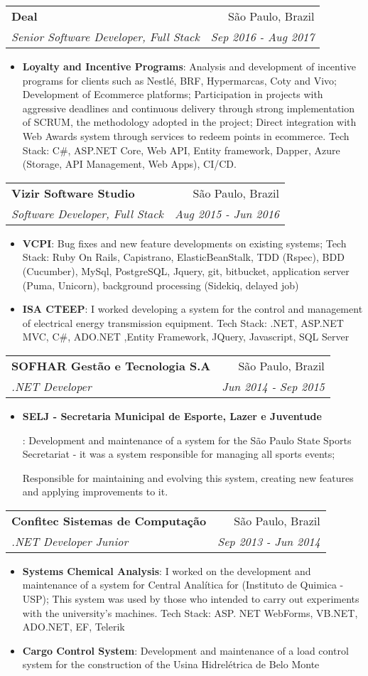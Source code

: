 \documentclass[letterpaper,11pt]{article}
\makeatletter
\newcommand{\resumeItem}[2]{
  \item\small{
    \textbf{#1}{: #2 \vspace{-2pt}}
  }
}
\newcommand{\resumeSubheading}[4]{
  \vspace{-1pt}\item
    \begin{tabular*}{0.97\textwidth}[t]{l@{\extracolsep{\fill}}r}
      \textbf{#1} & #2 \\
      \textit{\small#3} & \textit{\small #4} \\
    \end{tabular*}\vspace{-5pt}
}
\newcommand{\resumeSubSubheading}[2]{
    \begin{tabular*}{0.97\textwidth}{l@{\extracolsep{\fill}}r}
      \textit{\small#1} & \textit{\small #2} \\
    \end{tabular*}\vspace{-5pt}
}
\newcommand{\resumeSubHeadingListEnd}{\end{itemize}}
\newcommand{\resumeItemListStart}{\begin{itemize}}
\newcommand{\resumeItemListEnd}{\end{itemize}\vspace{-5pt}}
\makeatother
\begin{document}
    \resumeSubheading
    {Deal}{São Paulo, Brazil}
    {Senior Software Developer, Full Stack}{Sep 2016 - Aug 2017}
    \resumeItemListStart
      \resumeItem{Loyalty and Incentive Programs}
        {Analysis and development of incentive programs for clients such as Nestlé, BRF, Hypermarcas, Coty and Vivo;
        Development of Ecommerce platforms;
        Participation in projects with aggressive deadlines and continuous delivery through strong implementation of SCRUM, the methodology adopted in the project;
        Direct integration with Web Awards system through services to redeem points in ecommerce.
        Tech Stack: C\#, ASP.NET Core, Web API, Entity framework, Dapper, Azure (Storage, API Management, Web Apps), CI/CD.}
    \resumeItemListEnd

    \resumeSubheading
      {Vizir Software Studio}{São Paulo, Brazil}
      {Software Developer, Full Stack}{Aug 2015 - Jun 2016}
      \resumeItemListStart
        \resumeItem{VCPI}
          {Bug fixes and new feature developments on existing systems; Tech Stack: Ruby On Rails, Capistrano, ElasticBeanStalk, TDD
          (Rspec), BDD (Cucumber), MySql, PostgreSQL, Jquery, git, bitbucket, application server (Puma, Unicorn), background processing (Sidekiq, delayed job)}
        \resumeItem{ISA CTEEP}
          {I worked developing a system for the control and management of electrical energy transmission equipment. Tech Stack: .NET, ASP.NET MVC, C\#, ADO.NET ,Entity Framework, JQuery, Javascript, SQL Server}
      \resumeItemListEnd
      
    \resumeSubheading
    {SOFHAR Gestão e Tecnologia S.A}{São Paulo, Brazil}
    {.NET Developer}{Jun 2014 - Sep 2015}
    \resumeItemListStart
      \resumeItem{SELJ - Secretaria Municipal de Esporte, Lazer e Juventude}
        {Development and maintenance of a system for the São Paulo State Sports Secretariat - it was a system responsible for managing all sports events;

        Responsible for maintaining and evolving this system, creating new features and applying improvements to it.}
    \resumeItemListEnd


    \resumeSubheading
      {Confitec Sistemas de Computação}{São Paulo, Brazil}
      {.NET Developer Junior}{Sep 2013 - Jun 2014}
      \resumeItemListStart
        \resumeItem{Systems Chemical Analysis}
          {I worked on the development and maintenance of a system for Central Analítica for (Instituto de Quimica - USP);
           This system was used by those who intended to carry out experiments with the university's machines. Tech Stack: ASP. NET WebForms, VB.NET, ADO.NET, EF, Telerik}
        \resumeItem{Cargo Control System}
          {Development and maintenance of a load control system for the construction of the Usina Hidrelétrica de Belo Monte}
      \resumeItemListEnd
\end{document}
